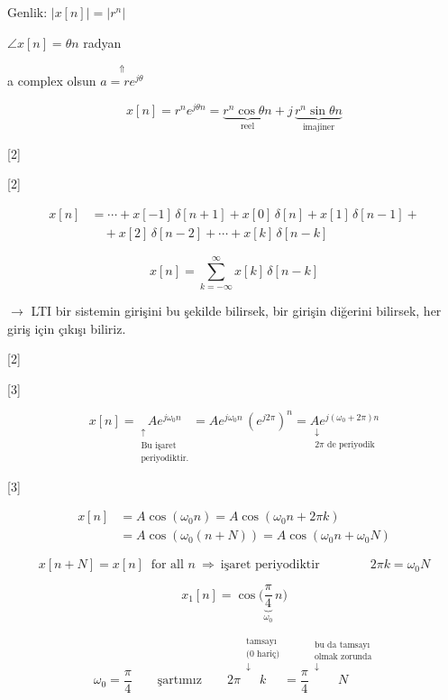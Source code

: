 \documentclass[11pt,a4paper]{article}
\begin{document}
Genlik: $|x[n]| = |r^n|$

$\angle x[n] = \theta n$ radyan

a complex olsun \quad $\overset{\Uparrow}{a = re^{j\theta}}$

\[ x[n] = r^n e^{j\theta n} = \underbrace{r^n \cos\theta n}_{\text{reel}} + j\,\underbrace{r^n \sin\theta n}_{\text{imajiner}} \]

[2]

[2]

\begin{align*}
x[n] &= \cdots + x[-1]\,\delta[n+1] + x[0]\,\delta[n] + x[1]\,\delta[n-1] + \\
&\quad + x[2]\,\delta[n-2] + \cdots + x[k]\,\delta[n-k]
\end{align*}

\[ x[n] = \sum_{k=-\infty}^{\infty} x[k]\,\delta[n-k] \]

$\rightarrow$ LTI bir sistemin girişini bu şekilde bilirsek, bir girişin diğerini bilirsek, her giriş için çıkışı biliriz.

[2]

[3]

\[ x[n] = \underset{\substack{\uparrow\\ \text{Bu işaret}\\ \text{periyodiktir.}}}{A e^{j\omega_0 n}} = A e^{j\omega_0 n}\,(e^{j2\pi})^n = \underset{\substack{\downarrow\\ \text{$2\pi$ de periyodik}}}{A e^{j(\omega_0+2\pi)n}} \]

[3]

\begin{align*}
x[n] &= A\cos(\omega_0 n) = A\cos(\omega_0 n + 2\pi k) \\
&= A\cos(\omega_0 (n+N)) = A\cos(\omega_0 n + \omega_0 N)
\end{align*}

\[ x[n+N] = x[n] \ \text{ for all } n \ \Longrightarrow \ \text{işaret periyodiktir} \qquad\qquad 2\pi k = \omega_0 N \]

\[ x_1[n] = \cos\Big(\underbrace{\frac{\pi}{4}}_{\omega_0}\, n\Big) \]

\[ \omega_0 = \frac{\pi}{4} \qquad \text{şartımız} \qquad 2\pi\,\overset{\substack{\text{tamsayı}\\ \text{(0 hariç)}\\ \downarrow}}{k} = \frac{\pi}{4}\,\overset{\substack{\text{bu da tamsayı}\\ \text{olmak zorunda}\\ \downarrow}}{N} \]
\end{document}
